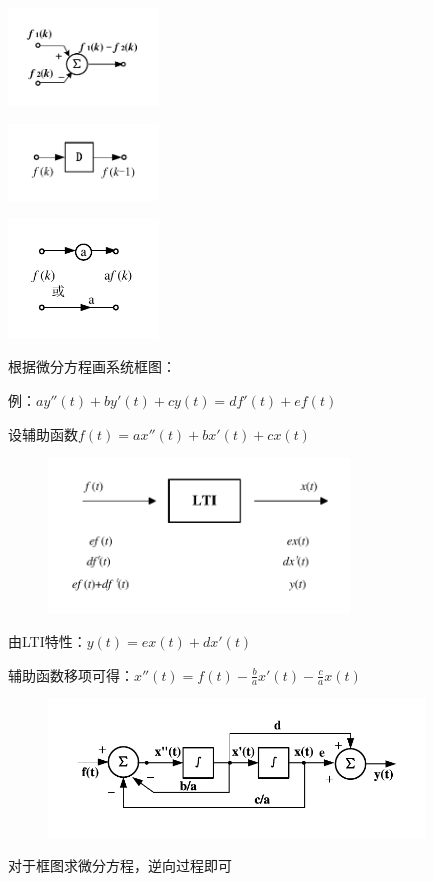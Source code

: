 \begin{Figure}[离散系统的基本单元]
    \begin{FigureSub}[离散系统的加法器]
        \includegraphics[width=40mm]{visio/1.17-a.pdf}
    \end{FigureSub}
    \begin{FigureSub}[离散系统的延时器]
        \includegraphics[width=40mm]{visio/1.17-b.pdf}
    \end{FigureSub}
    \begin{FigureSub}[离散系统的数乘器]
        \includegraphics[width=40mm]{visio/1.17-c.pdf}
    \end{FigureSub}
\end{Figure}

根据微分方程画系统框图：

例：$ay''(t)+by'(t)+cy(t) = df'(t)+ef(t)$

设辅助函数$f(t)=ax''(t)+bx'(t)+cx(t)$

\begin{figure}[H]
    \centering
    \includegraphics[width=80mm]{visio/sol1.pdf}
\end{figure}

由LTI特性：$y(t)=ex(t)+dx'(t)$

辅助函数移项可得：$x''(t)=f(t)-\frac{b}{a}x'(t)-\frac{c}{a}x(t)$


\begin{figure}[H]
    \centering
    \includegraphics[width=100mm]{visio/sol2.pdf}
\end{figure}

对于框图求微分方程，逆向过程即可



